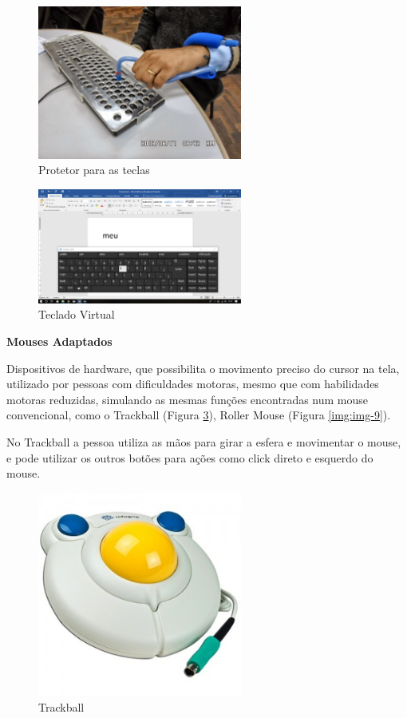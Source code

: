 \documentclass[
	12pt,			%
	openright,		%
	oneside,			%
	a4paper,			%
	chapter=TITLE,		%
	english,			%
	brazil,			%
	]{abntex2}
\begin{document}
\begin{figure}[H]
	\centering
		\includegraphics[width=0.6\textwidth]{./img/img-7.jpg}
		\caption{Protetor para as teclas}
		\label{img:img-7}
\end{figure}

\begin{figure}[H]
	\centering
		\includegraphics[width=0.6\textwidth]{./img/img-6.png}
		\caption{Teclado Virtual}
		\label{img:img-6}
\end{figure}

\textbf{Mouses Adaptados}

Dispositivos de hardware, que possibilita o movimento preciso do cursor na tela, utilizado por pessoas com dificuldades motoras, mesmo que com habilidades motoras reduzidas, simulando as mesmas funções encontradas num mouse convencional, como o Trackball (Figura \ref{img:img-8}), Roller Mouse (Figura \ref{img:img-9}).

No Trackball a pessoa utiliza as mãos para girar a esfera e movimentar o mouse, e pode utilizar os outros botões para ações como click direto e esquerdo do mouse.

\begin{figure}[H]
	\centering
		\includegraphics[width=0.6\textwidth]{./img/img-8.jpg}
		\caption{Trackball}
		\label{img:img-8}
\end{figure}
\end{document}
